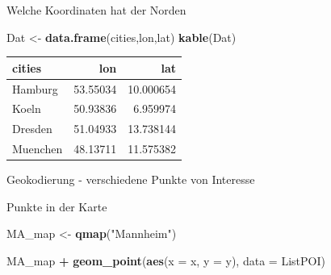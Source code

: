 \documentclass[ignorenonframetext,]{beamer}
\newenvironment{Shaded}{\begin{snugshade}}{\end{snugshade}}
\newcommand{\DataTypeTok}[1]{\textcolor[rgb]{0.13,0.29,0.53}{#1}}
\newcommand{\KeywordTok}[1]{\textcolor[rgb]{0.13,0.29,0.53}{\textbf{#1}}}
\newcommand{\NormalTok}[1]{#1}
\newcommand{\OperatorTok}[1]{\textcolor[rgb]{0.81,0.36,0.00}{\textbf{#1}}}
\newcommand{\StringTok}[1]{\textcolor[rgb]{0.31,0.60,0.02}{#1}}
\begin{document}
\begin{frame}[fragile]{Welche Koordinaten hat der Norden}
\protect\hypertarget{welche-koordinaten-hat-der-norden}{}

\begin{Shaded}
\begin{Highlighting}[]
\NormalTok{Dat <-}\StringTok{ }\KeywordTok{data.frame}\NormalTok{(cities,lon,lat)}
\KeywordTok{kable}\NormalTok{(Dat)}
\end{Highlighting}
\end{Shaded}

\begin{longtable}[]{@{}lrr@{}}
\toprule
cities & lon & lat\tabularnewline
\midrule
\endhead
Hamburg & 53.55034 & 10.000654\tabularnewline
Koeln & 50.93836 & 6.959974\tabularnewline
Dresden & 51.04933 & 13.738144\tabularnewline
Muenchen & 48.13711 & 11.575382\tabularnewline
\bottomrule
\end{longtable}

\end{frame}

\begin{frame}[fragile]{Geokodierung - verschiedene Punkte von Interesse}
\protect\hypertarget{geokodierung---verschiedene-punkte-von-interesse}{}

\begin{Shaded}
\end{Shaded}

\end{frame}

\begin{frame}[fragile]{Punkte in der Karte}
\protect\hypertarget{punkte-in-der-karte}{}

\begin{Shaded}
\begin{Highlighting}[]
\NormalTok{MA_map <-}\StringTok{ }\KeywordTok{qmap}\NormalTok{(}\StringTok{"Mannheim"}\NormalTok{)}
\end{Highlighting}
\end{Shaded}

\begin{Shaded}
\begin{Highlighting}[]
\NormalTok{MA_map }\OperatorTok{+}
\KeywordTok{geom_point}\NormalTok{(}\KeywordTok{aes}\NormalTok{(}\DataTypeTok{x =}\NormalTok{ x, }\DataTypeTok{y =}\NormalTok{ y),}
\DataTypeTok{data =}\NormalTok{ ListPOI)}
\end{Highlighting}
\end{Shaded}

\end{frame}
\end{document}
